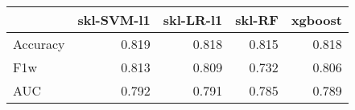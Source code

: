 \begin{tabular}{lrrrr}
\toprule
{} &  skl-SVM-l1 &  skl-LR-l1 &  skl-RF &  xgboost \\
\midrule
Accuracy &       0.819 &      0.818 &   0.815 &    0.818 \\
F1w      &       0.813 &      0.809 &   0.732 &    0.806 \\
AUC      &       0.792 &      0.791 &   0.785 &    0.789 \\
\bottomrule
\end{tabular}
